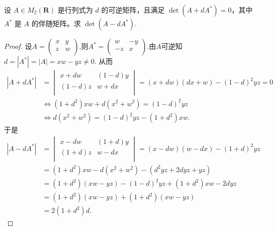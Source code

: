 \documentclass[../../main.tex]{subfiles}
\begin{document}
\begin{example}
设 $A \in M_2(\mathbf{R})$ 是行列式为 $d$ 的可逆矩阵，且满足 $\det(A + dA^* ) = 0$，其中 $A^*$ 是 $A$ 的伴随矩阵。求 $\det(A - dA^* ).$
\end{example}
\begin{proof}
设$A=\begin{pmatrix}
x&		y\\
z&		w\\
\end{pmatrix}$,则$A^*=\begin{pmatrix}
w&		-y\\
-z&		x\\
\end{pmatrix}$.由$A$可逆知
$d=|A^*|=|A|=xw-yz\ne 0.$
从而
\begin{align*}
|A+dA^*|&=\begin{vmatrix}
x+dw&		(1-d) y\\
(1-d) z&		w+dx\\
\end{vmatrix}=(x+dw)(dx+w)-(1-d)^2yz=0
\\
&\Longleftrightarrow (1+d^2)xw+d(x^2+w^2)=(1-d)^2yz
\\
&\Longleftrightarrow d(x^2+w^2)=(1-d)^2yz-(1+d^2)xw.
\end{align*}
于是
\begin{align*}
|A-dA^*|&=\begin{vmatrix}
x-dw&		(1+d) y\\
(1+d) z&		w-dx\\
\end{vmatrix}=(x-dw)(w-dx)-(1+d)^2yz
\\
&=(1+d^2)xw-d(x^2+w^2)-(d^2yz+2dyz+yz)
\\
&=(1+d^2)(xw-yz)-(1-d)^2yz+(1+d^2)xw-2dyz
\\
&=(1+d^2)(xw-yz)+(1+d^2)(xw-yz)
\\
&=2(1+d^2)d.
\end{align*}

\end{proof}
\end{document}
